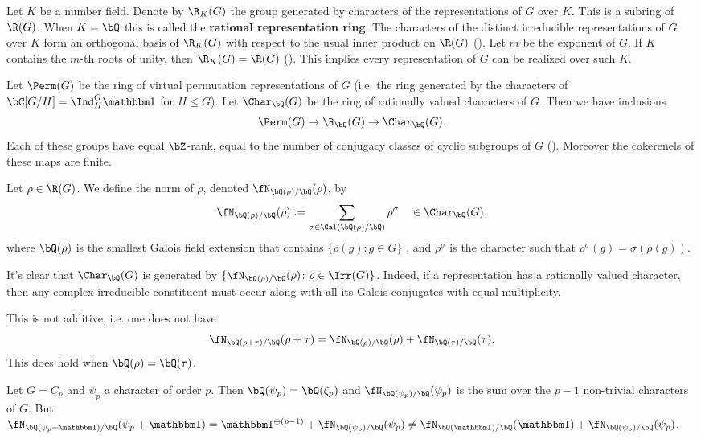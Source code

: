Let $K$ be a number field. Denote by $\R_K(G)$ the group generated by characters of the representations of $G$ over $K$. This is a subring of $\R(G)$.
When $K = \bQ$ this is called the \textbf{rational representation ring}.
The characters of the distinct irreducible representations of $G$ over $K$ form an orthogonal basis of $\R_K(G)$ with respect to the usual inner product on $\R(G)$ (\cite[Proposition 32]{Serre}).
Let $m$ be the exponent of $G$. If $K$ contains the $m$-th roots of unity, then $\R_K(G) = \R(G)$ (\cite[Theorem 24]{Serre}). This implies every representation of $G$ can be realized over such $K$. 
\vspace{1em}

Let $\Perm(G)$ be the ring of virtual permutation representations of $G$ (i.e. the ring generated by the characters of $\bC[G / H] = \Ind_{H}^G \trivial$ for $H \leq G$). Let $\Char_{\bQ}(G)$ be the ring of rationally valued characters of $G$. Then we have inclusions 
\[ \Perm(G) \to \R_{\bQ}(G) \to \Char_{\bQ}(G). \]
Each of these groups have equal $\bZ$-rank, equal to the number of conjugacy classes of cyclic subgroups of $G$ (\cite[Chapter 13, \S13.1]{Serre}). Moreover the cokerenels of these maps are finite.

\begin{defn}\label{rho-norm}
    Let $\rho \in \R(G)$. We define the norm of $\rho$, denoted $\repnorm{\rho}$, by 
    \[
    \repnorm{\rho} \defeq \sum_{\sigma \in \Gal(\bQ(\rho)/\bQ)}  \rho^\sigma \quad \in \Char_{\bQ}(G),
    \]
    where $\bQ(\rho)$ is the smallest Galois field extension that contains $ \{\rho(g) \colon g \in G \}$ , and $\rho^\sigma$ is the character such that $\rho^\sigma(g) = \sigma(\rho(g))$.
\end{defn}

It's clear that $\Char_{\bQ}(G)$ is generated by $\{ \repnorm{\rho} \colon \rho \in \Irr(G) \}$. Indeed, if a representation has a rationally valued character, then any complex irreducible constituent must occur along with all its Galois conjugates with equal multiplicity.

\begin{rem}
This is not additive, i.e. one does not have \[\repnorm{\rho + \tau} = \repnorm{\rho} + \repnorm{\tau}. \] 
This does hold when $\bQ(\rho) = \bQ(\tau)$. 
\end{rem}

\begin{example}
    Let $G = C_p$ and $\psi_p$ a character of order $p$. Then $\bQ(\psi_p) = \bQ(\zeta_p)$ and $\repnorm{\psi_p}$ is the sum over the $p - 1$ non-trivial characters of $G$. But $\repnorm{\psi_p + \trivial} = \trivial^{\oplus (p - 1)} + \repnorm{\psi_p} \not= \repnorm{\trivial} + \repnorm{\psi_p}$.
\end{example}

